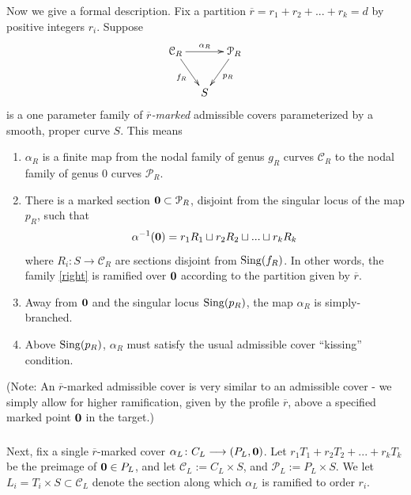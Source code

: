 \documentclass[reqno, 10 pt]{article}
\theoremstyle{definition}
\theoremstyle{remark}
\numberwithin{equation}{section}
\numberwithin{thm}{section}
\numberwithin{prop}{section}
\numberwithin{lem}{section}
\numberwithin{cor}{section}
\numberwithin{conj}{section}
\numberwithin{defn}{section}
\renewcommand{\to}{\longrightarrow}
\newcommand{\cC}{{\mathcal C}}
\newcommand{\cP}{{\mathcal P}}
\newcommand {\from}{{\colon}}
\begin{document}
     \subsubsection{} \label{markedadmissible}
     Now we give a formal description. Fix a partition $\overline{r} = r_{1} + r_{2} + ... + r_{k} = d$ by positive integers $r_{i}$. Suppose 
      \begin{equation}\label{right}
    \xymatrix @C -1.1pc  {
    \cC_{R}\ar[rr]^{\alpha_{R}} \ar[rd]_{f_{R}}&&
    \cP_{R} \ar[ld]^{p_{R}}\\
    & S}
     \end{equation} 
     is a one parameter family of {\sl $\overline{r}$-marked} admissible covers parameterized by a smooth, proper curve $S$.  This means 
    \begin{enumerate}
    \item $\alpha_{R}$ is a finite map from the nodal family of genus $g_{R}$ curves $\cC_{R}$ to the nodal family of genus $0$ curves $\cP_{R}$.



     \item  There is a marked section ${\bf 0} \subset \cP_{R}$, disjoint from the singular locus of the map $p_{R}$, such that \[\alpha^{-1}({\bf 0}) = r_{1}R_{1} \sqcup r_{2}R_{2} \sqcup ... \sqcup r_{k}R_{k}\] where $R_{i} \from S \to \cC_{R}$ are sections disjoint from ${\rm Sing}(f_{R})$. In other words, the family \eqref{right} is ramified over ${\bf 0}$ according to the partition given by $\overline{r}$.
     

     
     \item Away from ${\bf 0}$ and the singular locus ${\rm Sing}(p_{R})$, the map $\alpha_{R}$ is simply-branched. 
     
     \item Above ${\rm Sing}(p_{R})$, $\alpha_{R}$ must satisfy the usual admissible cover ``kissing'' condition.
     \end{enumerate}
     (Note: An $\overline{r}$-marked admissible cover is very similar to an admissible cover - we simply allow for higher ramification, given by the profile $\overline{r}$, above a specified marked point ${\bf 0}$ in the target.)
   
   \subsubsection{}
     Next, fix a single $\overline{r}$-marked cover $\alpha_{L} \from C_{L} \to (P_{L}, {\bf 0})$. Let $r_{1}T_{1}+ r_{2}T_{2}+... +r_{k}T_{k}$ be the preimage of ${\bf 0} \in P_{L}$, and let $\cC_{L} := C_{L} \times S$, and $\cP_{L} := P_{L} \times S$.  We let $L_{i} = T_{i} \times S \subset \cC_{L}$ denote the section along which $\alpha_{L}$ is ramified to order $r_{i}$. 
\end{document}
